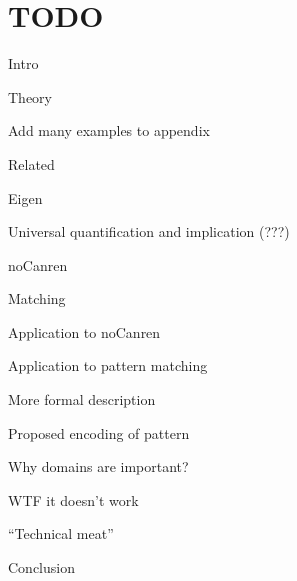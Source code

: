\documentclass
  [screen
  , acmlarge
  ,review
  ]{acmart}
\begin{document}





\maketitle

\thispagestyle{empty}



\section{TODO}
  \begin{todolist}
    \item[\done] Intro
    \item[\wip] Theory
        \begin{todolist}
          \item Add many examples to appendix 
        \end{todolist}
    \item[\wip] Related 
    \begin{todolist}
      \item[\wip] Eigen 
      \item[\wip] Universal quantification and implication (???)
      \item[\wip] noCanren 
      \item[\wip] Matching 
    \end{todolist}
    \item Application to noCanren 
    \item Application to pattern matching 
        \begin{todolist}
          \item More formal description
          \item Proposed encoding of pattern 
          \item Why domains are important?
          \item WTF it doesn't work
        \end{todolist}
     \item ``Technical meat''   
     \item Conclusion
  \end{todolist}
  
\end{document}

